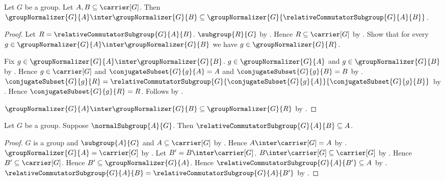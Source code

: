 \begin{theorem}\label{common_normalizer_normalizes_relative_commutator}
    Let $G$ be a group.
    Let $A,B\subseteq\carrier[G]$.
    Then
        $\groupNormalizer{G}{A}\inter\groupNormalizer{G}{B}
            \subseteq
        \groupNormalizer{G}{
            \relativeCommutatorSubgroup{G}{A}{B}}$.
\end{theorem}
\begin{proof}
    Let $R=\relativeCommutatorSubgroup{G}{A}{B}$.
    $\subgroup{R}{G}$ by
        .
    Hence $R\subseteq\carrier[G]$ by .
    Show that for every
        $g\in\groupNormalizer{G}{A}\inter\groupNormalizer{G}{B}$
        we have $g\in\groupNormalizer{G}{R}$.
    \begin{subproof}
        Fix
            $g\in\groupNormalizer{G}{A}\inter\groupNormalizer{G}{B}$.
        $g\in\groupNormalizer{G}{A}$ and
            $g\in\groupNormalizer{G}{B}$ by
            .
        Hence $g\in\carrier[G]$ and
            $\conjugateSubset{G}{g}{A}=A$ and
            $\conjugateSubset{G}{g}{B}=B$ by
            .
        $\conjugateSubset{G}{g}{R}=
            \relativeCommutatorSubgroup{G}
                {\conjugateSubset{G}{g}{A}}
                {\conjugateSubset{G}{g}{B}}$ by
            .
        Hence $\conjugateSubset{G}{g}{R}=R$.
        Follows by .
    \end{subproof}
    $\groupNormalizer{G}{A}\inter\groupNormalizer{G}{B}
        \subseteq\groupNormalizer{G}{R}$ by .
\end{proof}

\begin{corollary}\label{normal_subgroup_contains_relative_commutator}
    Let $G$ be a group.
    Suppose $\normalSubgroup{A}{G}$.
    Then $\relativeCommutatorSubgroup{G}{A}{B}\subseteq A$.
\end{corollary}
\begin{proof}
    $G$ is a group and $\subgroup{A}{G}$ and
        $A\subseteq\carrier[G]$ by
        .
    Hence $A\inter\carrier[G]=A$ by
        .
    $\groupNormalizer{G}{A}=\carrier[G]$ by
        .
    Let $B'=B\inter\carrier[G]$.
    $B\inter\carrier[G]\subseteq\carrier[G]$ by
        .
    Hence $B'\subseteq\carrier[G]$.
    Hence $B'\subseteq\groupNormalizer{G}{A}$.
    Hence $\relativeCommutatorSubgroup{G}{A}{B'}\subseteq A$ by
        .
    $\relativeCommutatorSubgroup{G}{A}{B}=
        \relativeCommutatorSubgroup{G}{A}{B'}$ by
        .
\end{proof}

